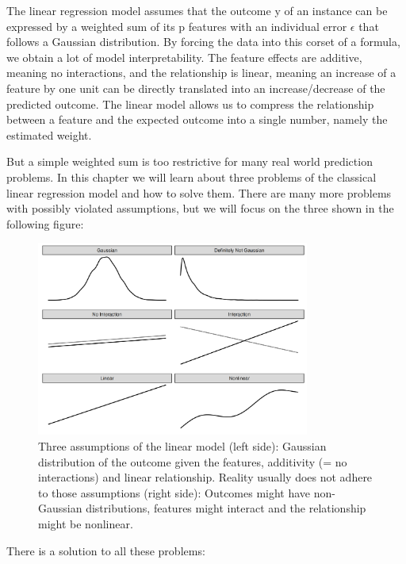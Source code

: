 \documentclass[
  11pt,
]{scrbook}
\begin{document}
The linear regression model assumes that the outcome y of an instance can be expressed by a weighted sum of its p features with an individual error \(\epsilon\) that follows a Gaussian distribution.
By forcing the data into this corset of a formula, we obtain a lot of model interpretability.
The feature effects are additive, meaning no interactions, and the relationship is linear, meaning an increase of a feature by one unit can be directly translated into an increase/decrease of the predicted outcome.
The linear model allows us to compress the relationship between a feature and the expected outcome into a single number, namely the estimated weight.

But a simple weighted sum is too restrictive for many real world prediction problems.
In this chapter we will learn about three problems of the classical linear regression model and how to solve them.
There are many more problems with possibly violated assumptions, but we will focus on the three shown in the following figure:

\begin{figure}

{\centering \includegraphics[width=0.8\textwidth]{images/three-lm-problems-1} 

}

\caption{Three assumptions of the linear model (left side): Gaussian distribution of the outcome given the features, additivity (= no interactions) and linear relationship. Reality usually does not adhere to those assumptions (right side): Outcomes might have non-Gaussian distributions, features might interact and the relationship might be nonlinear.}\label{fig:three-lm-problems}
\end{figure}

There is a solution to all these problems:
\end{document}
